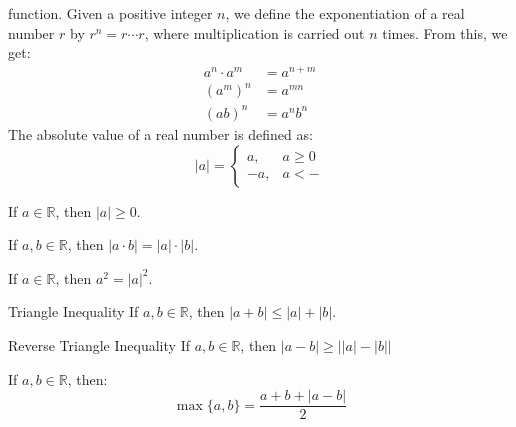             function. Given a positive integer $n$, we define the
            exponentiation of a real number $r$ by
            $r^{n}=r\cdots{r}$, where multiplication is
            carried out $n$ times. From this, we get:
            \begin{subequations}
                \begin{align}
                    a^{n}\cdot{a}^{m}&=a^{n+m}\\
                    (a^{m})^{n}&=a^{mn}\\
                    (ab)^{n}&=a^{n}b^{n}
                \end{align}
            \end{subequations}
            The absolute value of a real number is defined as:
            \begin{equation}
                |a|=
                \begin{cases}
                    a,&a\geq{0}\\
                    \minus{a},&a<-
                \end{cases}
            \end{equation}
            \begin{theorem}
                If $a\in\mathbb{R}$, then $|a|\geq{0}$.
            \end{theorem}
            \begin{theorem}
                If $a,b\in\mathbb{R}$, then
                $|a\cdot{b}|=|a|\cdot|b|$.
            \end{theorem}
            \begin{theorem}
                If $a\in\mathbb{R}$, then $a^{2}=|a|^{2}$.
            \end{theorem}
            \begin{ltheorem}{Triangle Inequality}
                If $a,b\in\mathbb{R}$, then
                $|a+b|\leq|a|+|b|$.
            \end{ltheorem}
            \begin{ltheorem}{Reverse Triangle Inequality}
                If $a,b\in\mathbb{R}$, then
                $|a-b|\geq\big||a|-|b|\big|$
            \end{ltheorem}
            \begin{theorem}
                If $a,b\in\mathbb{R}$, then:
                \begin{equation}
                    \max\{a,b\}=\frac{a+b+|a-b|}{2}
                \end{equation}
            \end{theorem}

